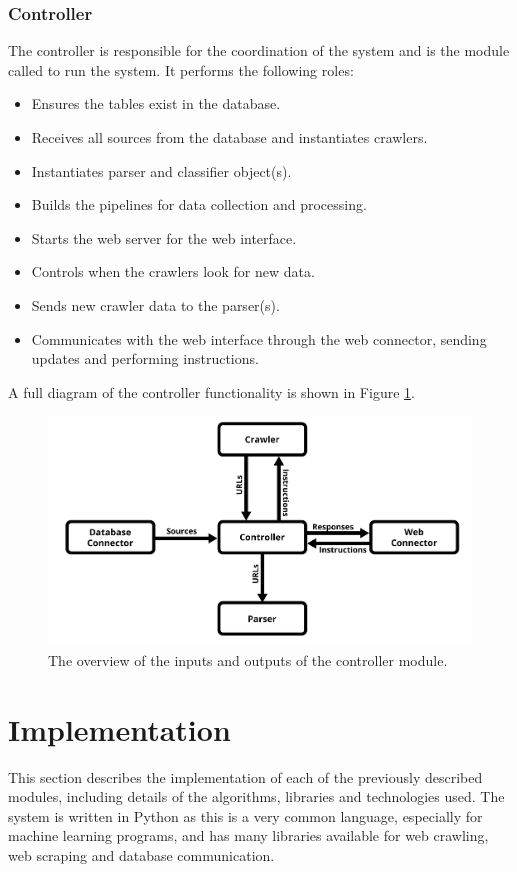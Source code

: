 \documentclass{l4proj}
\begin{document}
\subsection{Controller}
The controller is responsible for the coordination of the system and is the module called to run the system. It performs the following roles:
\begin{itemize}
    \item Ensures the tables exist in the database.
    \item Receives all sources from the database and instantiates crawlers.
    \item Instantiates parser and classifier object(s).
    \item Builds the pipelines for data collection and processing.
    \item Starts the web server for the web interface.
    \item Controls when the crawlers look for new data.
    \item Sends new crawler data to the parser(s).
    \item Communicates with the web interface through the web connector, sending updates and performing instructions.
\end{itemize}
A full diagram of the controller functionality is shown in Figure \ref{fig:controller_diagram}.
 \begin{figure}[h]
\centering
\includegraphics[width=\textwidth]{images/Controller-diagram.png}
\caption{The overview of the inputs and outputs of the controller module.}
\label{fig:controller_diagram}
\end{figure}



\chapter{Implementation}
This section describes the implementation of each of the previously described modules, including details of the algorithms, libraries and technologies used. The system is written in Python as this is a very common language, especially for machine learning programs, and has many libraries available for web crawling, web scraping and database communication.
\end{document}
